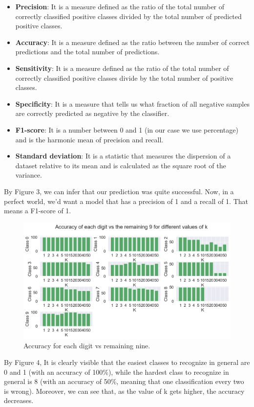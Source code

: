 \documentclass[10pt]{article}
\begin{document}
\begin{itemize}
 \item \textbf{Precision}: It is a measure defined as the ratio of the total number of correctly classified positive classes divided by the total number of predicted positive classes.
 \item \textbf{Accuracy}: It is a measure defined as the ratio between the number of correct predictions and the total number of predictions.
 \item \textbf{Sensitivity}: It is a measure defined as the ratio of the total number of correctly classified positive classes divide by the total number of positive classes.
 \item \textbf{Specificity}: It is a measure that tells us what fraction of all negative samples are correctly predicted as negative by the classifier.
 \item \textbf{F1-score}: It is a number between 0 and 1 (in our case we use percentage) and is the harmonic mean of precision and recall.
 \item \textbf{Standard deviation}: It is a statistic that measures the dispersion of a dataset relative to its mean and is calculated as the square root of the variance.
 \end{itemize} 

By Figure 3, we can infer that our prediction was quite successful. Now, in a perfect world, we’d want a model that has a precision of 1 and a recall of 1. That means a F1-score of 1.


\begin{figure}[h] 
	\centering
	\includegraphics[width=1.0\columnwidth]{Figure_4.png} %
	\caption{Accuracy for each digit vs remaining nine.}
\end{figure}

By Figure 4, It is clearly visible that the easiest classes to recognize in general are 0 and 1 (with an accuracy of 100\%), while the hardest class to recognize in general is 8 (with an accuracy of 50\%, meaning that one classification every two is wrong).
Moreover, we can see that, as the value of k gets higher, the accuracy decreases.
\end{document}
